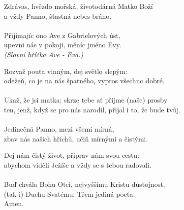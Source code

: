 \begin{translatioMulticol}{3}
Zdrávas, hvězdo mořská, životodárná Matko Boží\\
a vždy Panno, šťastná nebes bráno.\\
\\
Přijímajíc ono Ave z Gabrielových úst,\\
upevni nás v pokoji, měníc jméno Evy.\\
\textit{(Slovní hříčka Ave - Eva.)}\columnbreak

Rozvaž pouta vinným, dej světlo slepým:\\
odežeň, co je na nás špatného, vypros všechno dobré.\\
\\
Ukaž, že jsi matka: skrze tebe ať přijme (naše) prosby\\
ten, jenž, když se pro nás narodil, přijal i to, že bude tvůj.\\
\\
Jedinečná Panno, mezi všemi mírná,\\
zbav nás našich hříchů, učiň mírnými a čistými.\columnbreak

Dej nám čistý život, připrav nám svou cestu:\\
abychom viděli Ježíše a vždy se s tebou radovali.\\
\\
Buď chvála Bohu Otci, nejvyššímu Kristu důs\-toj\-nost,\\
(tak i) Duchu Svatému; Třem jediná pocta.\\
Amen.
\end{translatioMulticol}
